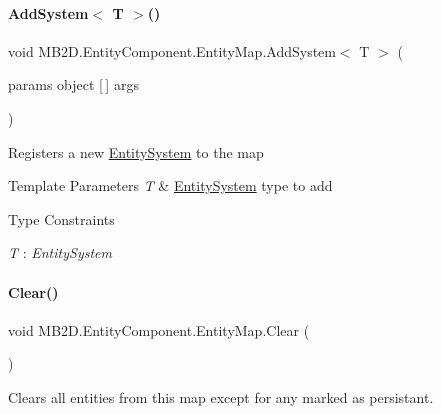 \paragraph{\texorpdfstring{Add\+System$<$ T $>$()}{AddSystem< T >()}}
{\footnotesize\ttfamily void M\+B2\+D.\+Entity\+Component.\+Entity\+Map.\+Add\+System$<$ T $>$ (\begin{DoxyParamCaption}\item[{params object \mbox{[}$\,$\mbox{]}}]{args }\end{DoxyParamCaption})\hspace{0.3cm}{\ttfamily [inline]}}



Registers a new \hyperlink{class_m_b2_d_1_1_entity_component_1_1_entity_system}{Entity\+System} to the map 


\begin{DoxyTemplParams}{Template Parameters}
{\em T} & \hyperlink{class_m_b2_d_1_1_entity_component_1_1_entity_system}{Entity\+System} type to add\\
\hline
\end{DoxyTemplParams}
\begin{Desc}
\item[Type Constraints]\begin{description}
\item[{\em T} : {\em Entity\+System}]\end{description}
\end{Desc}
\hypertarget{class_m_b2_d_1_1_entity_component_1_1_entity_map_a079e8e957e7fbaa8de73e609ab646fe1}{}\label{class_m_b2_d_1_1_entity_component_1_1_entity_map_a079e8e957e7fbaa8de73e609ab646fe1} 
\paragraph{\texorpdfstring{Clear()}{Clear()}}
{\footnotesize\ttfamily void M\+B2\+D.\+Entity\+Component.\+Entity\+Map.\+Clear (\begin{DoxyParamCaption}{ }\end{DoxyParamCaption})\hspace{0.3cm}{\ttfamily [inline]}}



Clears all entities from this map except for any marked as persistant. 

